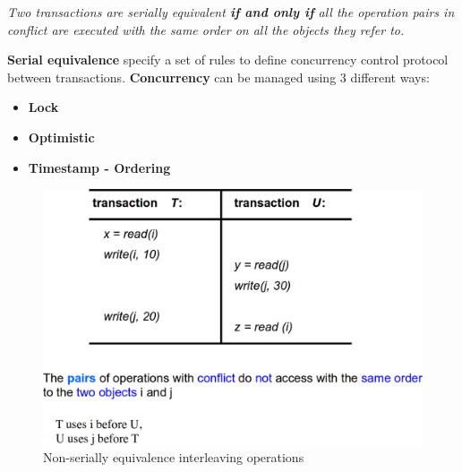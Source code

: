 \textit{Two transactions are serially equivalent \textbf{if and only if} all the operation pairs in conflict are executed with the same order on all the objects they refer to.}

\textbf{Serial equivalence} specify a set of rules to define concurrency control protocol between transactions. \textbf{Concurrency} can be managed using 3 different ways:
\begin{itemize}
    \item \textbf{Lock}
    \item \textbf{Optimistic}
    \item \textbf{Timestamp - Ordering}
\end{itemize}

\begin{figure}[!h]
    \centering
    \includegraphics[width=.80\linewidth]{images/TransactionAndConcurrencyControl/nonSeriallyEq.png}
    \caption{Non-serially equivalence interleaving operations}
\end{figure}
\newpage

